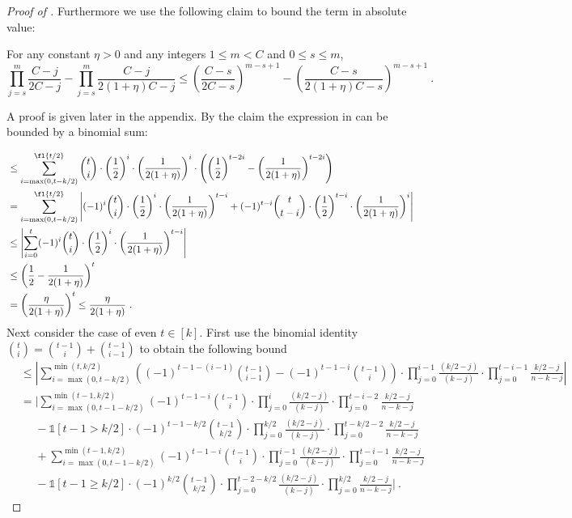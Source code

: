 \begin{proof}[Proof of ]
    Furthermore we use the following claim to bound the term in absolute value: 

    \begin{claim}\label{claim:diff-bound}
        For any constant $\eta > 0$ and any integers $  1\le m < C$ and $0\le s \le m$,
        \[\prod_{j=s}^{m}\frac{C-j}{2C-j} - \prod_{j=s}^{m}\frac{C-j}{2(1+\eta)C-j} \le \left(\frac{C-s}{2C-s}\right)^{m-s+1} - \left(\frac{C-s}{2(1+\eta)C-s}\right)^{m-s+1}~.\]
    \end{claim}
    A proof is given later in the appendix. By the claim the expression in  can be bounded by a binomial sum:

     \begin{align*}
         &\le \sum_{i=\max(0,t-k/2)}^{\fl{t/2}} \binom{t}{i} \cdot \left(\frac{1}{2}\right)^{i}  \cdot \left(\frac{1}{2(1+\eta)}\right)^{i} \cdot \left( \left(\frac{1}{2}\right)^{t-2i} - \left(\frac{1}{2(1+\eta)}\right)^{t-2i} \right) \\
         &= \sum_{i=\max(0,t-k/2)}^{\fl{t/2}} \left| (-1)^{i} \binom{t}{i} \cdot  \left(\frac{1}{2}\right)^{i} \cdot \left(\frac{1}{2(1+\eta)}\right)^{t-i} +  (-1)^{t-i} \binom{t}{t-i} \cdot \left(\frac{1}{2}\right)^{t-i} \cdot \left(\frac{1}{2(1+\eta)}\right)^{i} \right| \\
         &\le \left| \sum_{i=0}^t (-1)^{i} \binom{t}{i} \cdot \left(\frac{1}{2}\right)^{i} \cdot \left(\frac{1}{2(1+\eta)}\right)^{t-i} \right|\\
         &\le \left(\frac{1}{2} - \frac{1}{2(1+\eta)} \right)^t \\
         &=\left (\frac{\eta}{2(1+\eta)} \right)^t 
 \le\frac{\eta}{2(1+\eta)}~.
     \end{align*}
    Next consider the case of even $t\in[k]$. First use the binomial identity $\binom{t}{i} = \binom{t-1}{i}+ \binom{t-1}{i-1}$ to obtain the following bound
    \begin{align*}
        &\le \left|\sum_{i=\max(0,t-k/2) }^{ \min(t,k/2) } \left((-1)^{t-1-(i-1)}\binom{t-1}{i-1} - (-1)^{t-1-i} \binom{t-1}{i} \right)\cdot  \prod_{j=0}^{i-1} \frac{ (k/2-j)}{(k-j)} \cdot \prod_{j=0}^{t-i-1} \frac{  k/2-j}{ n-k-j}  \right|\\
        &=|\sum_{i=\max(0,t-1-k/2) }^{ \min(t-1,k/2)} (-1)^{t-1-i}\binom{t-1}{i}\cdot  \prod_{j=0}^{i} \frac{ (k/2-j)}{(k-j)} \cdot \prod_{j=0}^{t-i-2} \frac{  k/2-j}{ n-k-j} \\
        &~~~~~~- \mathbb{1}[t-1>k/2] \cdot   (-1)^{t-1-k/2}\binom{t-1}{k/2}\cdot  \prod_{j=0}^{k/2} \frac{ (k/2-j)}{(k-j)} \cdot \prod_{j=0}^{t-k/2-2} \frac{  k/2-j}{ n-k-j}\\
        &~~~~~~+\sum_{i=\max(0,t-1-k/2) }^{ \min(t-1,k/2)} (-1)^{t-1-i} \binom{t-1}{i} \cdot  \prod_{j=0}^{i-1} \frac{ (k/2-j)}{(k-j)} \cdot \prod_{j=0}^{t-i-1} \frac{  k/2-j}{ n-k-j} \\
        &~~~~~~- \mathbb{1}[t-1\ge k/2] \cdot   (-1)^{k/2}\binom{t-1}{k/2}\cdot  \prod_{j=0}^{t-2-k/2} \frac{ (k/2-j)}{(k-j)} \cdot \prod_{j=0}^{k/2} \frac{  k/2-j}{ n-k-j} |~.
    \end{align*}


\end{proof}
